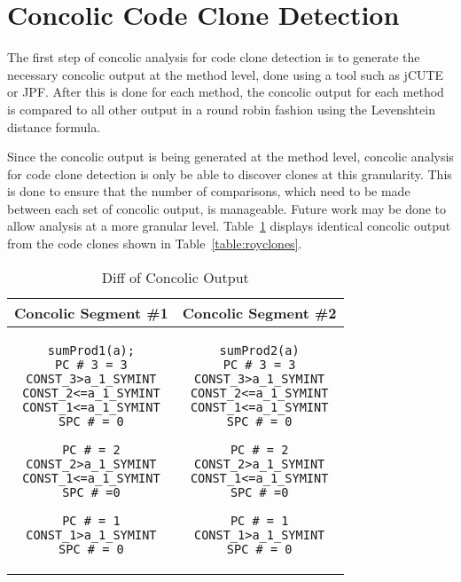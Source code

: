 \documentclass{sig-alternate}
\begin{document}






\section{Concolic Code Clone Detection}

The first step of concolic analysis for code clone detection is to generate the necessary concolic output at the method level, done using a tool such as jCUTE or JPF. After this is done for each method, the concolic output for each method is compared to all other output in a round robin fashion using the Levenshtein distance formula.

Since the concolic output is being generated at the method level, concolic analysis for code clone detection is only be able to discover clones at this granularity. This is done to ensure that the number of comparisons, which need to be made between each set of concolic output, is manageable. Future work may be done to allow analysis at a more granular level. Table~\ref{table:concolicoutputcomparision} displays identical concolic output from the code clones shown in Table~\ref{table:royclones}.

\noindent
\begin{table}
\centering
\begin{tabular}{c | c}
\bfseries Concolic Segment \#1  & \bfseries Concolic Segment \#2 \\ \hline \hline
\begin{lstlisting}
sumProd1(a);
PC # 3 = 3
CONST_3>a_1_SYMINT
CONST_2<=a_1_SYMINT
CONST_1<=a_1_SYMINT
SPC # = 0

PC # = 2
CONST_2>a_1_SYMINT
CONST_1<=a_1_SYMINT
SPC # =0

PC # = 1
CONST_1>a_1_SYMINT
SPC # = 0
\end{lstlisting}
&
\begin{lstlisting}
sumProd2(a)
PC # 3 = 3
CONST_3>a_1_SYMINT
CONST_2<=a_1_SYMINT
CONST_1<=a_1_SYMINT
SPC # = 0

PC # = 2
CONST_2>a_1_SYMINT
CONST_1<=a_1_SYMINT
SPC # =0

PC # = 1
CONST_1>a_1_SYMINT
SPC # = 0
\end{lstlisting}

\end{tabular}
\caption{Diff of Concolic Output}
~\label{table:concolicoutputcomparision}
\end{table}
\end{document}
